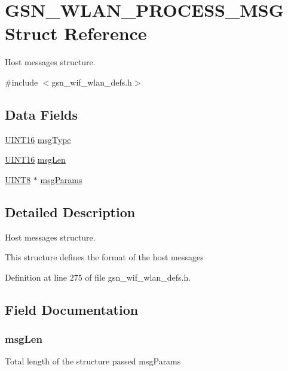 \hypertarget{a00418}{
\section{GSN\_\-WLAN\_\-PROCESS\_\-MSG Struct Reference}
\label{a00418}
}


Host messages structure.  




{\ttfamily \#include $<$gsn\_\-wif\_\-wlan\_\-defs.h$>$}

\subsection*{Data Fields}
\begin{DoxyCompactItemize}
\item 
\hyperlink{a00660_ga09f1a1fb2293e33483cc8d44aefb1eb1}{UINT16} \hyperlink{a00418_a99d30a827a47c76290ea00f3938e3521}{msgType}
\item 
\hyperlink{a00660_ga09f1a1fb2293e33483cc8d44aefb1eb1}{UINT16} \hyperlink{a00418_af4f59052b2ee830330fcdc59991f4822}{msgLen}
\item 
\hyperlink{a00660_gab27e9918b538ce9d8ca692479b375b6a}{UINT8} $\ast$ \hyperlink{a00418_ae04d54b2c5f3d01b691a7b1ae037667e}{msgParams}
\end{DoxyCompactItemize}


\subsection{Detailed Description}
Host messages structure. 

This structure defines the format of the host messages 

Definition at line 275 of file gsn\_\-wif\_\-wlan\_\-defs.h.



\subsection{Field Documentation}
\hypertarget{a00418_af4f59052b2ee830330fcdc59991f4822}{
\subsubsection[{msgLen}]{ {\bf msgLen}}}
\label{a00418_af4f59052b2ee830330fcdc59991f4822}
Total length of the structure passed msgParams 

